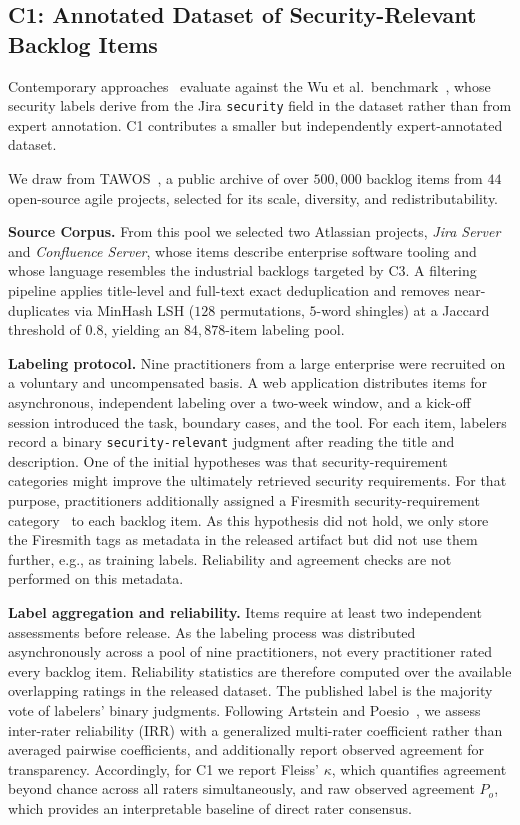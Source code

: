 \subsection*{C1: Annotated Dataset of Security-Relevant Backlog Items}

Contemporary approaches~\cite{alqahtani2024fasttext,franca2025gpts,soltaniani2026evaluating-llms} evaluate against the Wu et al.\ benchmark~\cite{wu2022data-quality}, whose security labels derive from the Jira \texttt{security} field in the dataset rather than from expert annotation.
C1 contributes a smaller but independently expert-annotated dataset.

We draw from TAWOS~\cite{tawosi2022tawos}, a public archive of over $500{,}000$ backlog items from $44$ open-source agile projects, selected for its scale, diversity, and redistributability.

\textbf{Source Corpus.}
From this pool we selected two Atlassian projects, \emph{Jira Server} and \emph{Confluence Server}, whose items describe enterprise software tooling and whose language resembles the industrial backlogs targeted by C3.
A filtering pipeline applies title-level and full-text exact deduplication and removes near-duplicates via MinHash LSH ($128$ permutations, $5$-word shingles) at a Jaccard threshold of $0.8$, yielding an $84{,}878$-item labeling pool.

\textbf{Labeling protocol.}
Nine practitioners from a large enterprise were recruited on a voluntary and uncompensated basis.
A web application distributes items for asynchronous, independent labeling over a two-week window, and a kick-off session introduced the task, boundary cases, and the tool.
For each item, labelers record a binary \texttt{security-relevant} judgment after reading the title and description.
One of the initial hypotheses was that security-requirement categories might improve the ultimately retrieved security requirements.
For that purpose, practitioners additionally assigned a Firesmith security-requirement category~\cite{firesmith2004specifying} to each backlog item.
As this hypothesis did not hold, we only store the Firesmith tags as metadata in the released artifact but did not use them further, e.g., as training labels.
Reliability and agreement checks are not performed on this metadata.

\textbf{Label aggregation and reliability.}
Items require at least two independent assessments before release. As the labeling process was distributed asynchronously across a pool of nine practitioners, not every practitioner rated every backlog item. Reliability statistics are therefore computed over the available overlapping ratings in the released dataset.
The published label is the majority vote of labelers' binary judgments.
Following Artstein and Poesio~\cite{artstein2008irr}, we assess inter-rater reliability (IRR) with a generalized multi-rater coefficient rather than averaged pairwise coefficients, and additionally report observed agreement for transparency.
Accordingly, for C1 we report Fleiss' $\kappa$, which quantifies  agreement beyond chance across all raters simultaneously, and raw observed agreement $P_o$, which provides an interpretable baseline of direct rater consensus.

